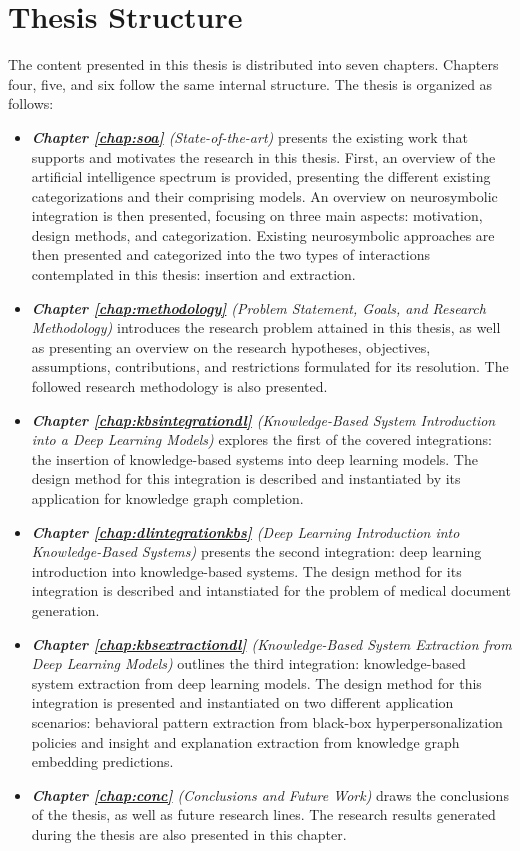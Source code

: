 \section{Thesis Structure}
The content presented in this thesis is distributed into seven chapters. Chapters four, five, and six follow the same internal structure. The thesis is organized as follows:
\begin{itemize}
    \item \textit{\textbf{Chapter \ref{chap:soa}} (State-of-the-art)} presents the existing work that supports and motivates the research in this thesis. First, an overview of the artificial intelligence spectrum is provided, presenting the different existing categorizations and their comprising models. An overview on neurosymbolic integration is then presented, focusing on three main aspects: motivation, design methods, and categorization. Existing neurosymbolic approaches are then presented and categorized into the two types of interactions contemplated in this thesis: insertion and extraction.
    
    \item \textit{\textbf{Chapter \ref{chap:methodology}} (Problem Statement, Goals, and Research Methodology)} introduces the research problem attained in this thesis, as well as presenting an overview on the research hypotheses, objectives, assumptions, contributions, and restrictions formulated for its resolution. The followed research methodology is also presented.
    
    \item \textit{\textbf{Chapter \ref{chap:kbsintegrationdl}} (Knowledge-Based System Introduction into a Deep Learning Models)} explores the first of the covered integrations: the insertion of knowledge-based systems into deep learning models. The design method for this integration is described and instantiated by its application for knowledge graph completion.
    
    \item \textit{\textbf{Chapter \ref{chap:dlintegrationkbs}} (Deep Learning Introduction into Knowledge-Based Systems)} presents the second integration: deep learning introduction into knowledge-based systems. The design method for its integration is described and intanstiated for the problem of medical document generation.
    
    \item \textit{\textbf{Chapter \ref{chap:kbsextractiondl}} (Knowledge-Based System Extraction from Deep Learning Models)} outlines the third integration: knowledge-based system extraction from deep learning models. The design method for this integration is presented and instantiated on two different application scenarios: behavioral pattern extraction from black-box hyperpersonalization policies and insight and explanation extraction from knowledge graph embedding predictions.
    
    \item \textit{\textbf{Chapter \ref{chap:conc}} (Conclusions and Future Work)} draws the conclusions of the thesis, as well as future research lines. The research results generated during the thesis are also presented in this chapter.
\end{itemize}
